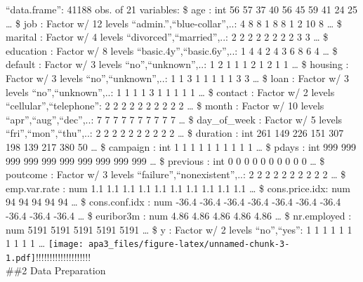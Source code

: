 \documentclass[english,man]{apa6}
\begin{document}
\enquote{data.frame}: 41188 obs. of 21 variables: \$ age : int 56 57 37
40 56 45 59 41 24 25 \ldots{} \$ job : Factor w/ 12 levels
\enquote{admin.},\enquote{blue-collar},..: 4 8 8 1 8 8 1 2 10 8 \ldots{}
\$ marital : Factor w/ 4 levels \enquote{divorced},\enquote{married},..:
2 2 2 2 2 2 2 2 3 3 \ldots{} \$ education : Factor w/ 8 levels
\enquote{basic.4y},\enquote{basic.6y},..: 1 4 4 2 4 3 6 8 6 4 \ldots{}
\$ default : Factor w/ 3 levels \enquote{no},\enquote{unknown},..: 1 2 1
1 1 2 1 2 1 1 \ldots{} \$ housing : Factor w/ 3 levels
\enquote{no},\enquote{unknown},..: 1 1 3 1 1 1 1 1 3 3 \ldots{} \$ loan
: Factor w/ 3 levels \enquote{no},\enquote{unknown},..: 1 1 1 1 3 1 1 1
1 1 \ldots{} \$ contact : Factor w/ 2 levels
\enquote{cellular},\enquote{telephone}: 2 2 2 2 2 2 2 2 2 2 \ldots{} \$
month : Factor w/ 10 levels
\enquote{apr},\enquote{aug},\enquote{dec},..: 7 7 7 7 7 7 7 7 7 7
\ldots{} \$ day\_of\_week : Factor w/ 5 levels
\enquote{fri},\enquote{mon},\enquote{thu},..: 2 2 2 2 2 2 2 2 2 2
\ldots{} \$ duration : int 261 149 226 151 307 198 139 217 380 50
\ldots{} \$ campaign : int 1 1 1 1 1 1 1 1 1 1 \ldots{} \$ pdays : int
999 999 999 999 999 999 999 999 999 999 \ldots{} \$ previous : int 0 0 0
0 0 0 0 0 0 0 \ldots{} \$ poutcome : Factor w/ 3 levels
\enquote{failure},\enquote{nonexistent},..: 2 2 2 2 2 2 2 2 2 2 \ldots{}
\$ emp.var.rate : num 1.1 1.1 1.1 1.1 1.1 1.1 1.1 1.1 1.1 1.1 \ldots{}
\$ cons.price.idx: num 94 94 94 94 94 \ldots{} \$ cons.conf.idx : num
-36.4 -36.4 -36.4 -36.4 -36.4 -36.4 -36.4 -36.4 -36.4 -36.4 \ldots{} \$
euribor3m : num 4.86 4.86 4.86 4.86 4.86 \ldots{} \$ nr.employed : num
5191 5191 5191 5191 5191 \ldots{} \$ y : Factor w/ 2 levels
\enquote{no},\enquote{yes}: 1 1 1 1 1 1 1 1 1 1 \ldots{}
\texttt{[image: apa3\_files/figure-latex/unnamed-chunk-3-1.pdf]}!\href{apa3_files/figure-latex/unnamed-chunk-3-2.pdf}{}!\href{apa3_files/figure-latex/unnamed-chunk-3-3.pdf}{}!\href{apa3_files/figure-latex/unnamed-chunk-3-4.pdf}{}!\href{apa3_files/figure-latex/unnamed-chunk-3-5.pdf}{}!\href{apa3_files/figure-latex/unnamed-chunk-3-6.pdf}{}!\href{apa3_files/figure-latex/unnamed-chunk-3-7.pdf}{}!\href{apa3_files/figure-latex/unnamed-chunk-3-8.pdf}{}!\href{apa3_files/figure-latex/unnamed-chunk-3-9.pdf}{}!\href{apa3_files/figure-latex/unnamed-chunk-3-10.pdf}{}!\href{apa3_files/figure-latex/unnamed-chunk-3-11.pdf}{}!\href{apa3_files/figure-latex/unnamed-chunk-3-12.pdf}{}!\href{apa3_files/figure-latex/unnamed-chunk-3-13.pdf}{}!\href{apa3_files/figure-latex/unnamed-chunk-3-14.pdf}{}!\href{apa3_files/figure-latex/unnamed-chunk-3-15.pdf}{}!\href{apa3_files/figure-latex/unnamed-chunk-3-16.pdf}{}!\href{apa3_files/figure-latex/unnamed-chunk-3-17.pdf}{}!\href{apa3_files/figure-latex/unnamed-chunk-3-18.pdf}{}!\href{apa3_files/figure-latex/unnamed-chunk-3-19.pdf}{}!\href{apa3_files/figure-latex/unnamed-chunk-3-20.pdf}{}!\href{apa3_files/figure-latex/unnamed-chunk-3-21.pdf}{}\\
 \#\#2 Data Preparation
\end{document}
